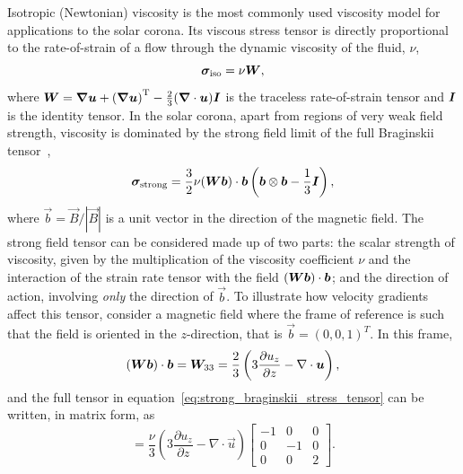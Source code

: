 Isotropic (Newtonian) viscosity is the most commonly used viscosity model for applications to the solar corona. Its viscous stress tensor is directly proportional to the rate-of-strain of a flow through the dynamic viscosity of the fluid, $\nu$,
\begin{equation}
{\bm \sigma}_{\text{iso}} = \nu {\bm W},
\label{eq:isotropic_stress_tensor}
\end{equation}
where ${\bm W} = {\bm \nabla {\bm u}} + {({\bm \nabla {\bm u}})}^{\text{T}} - \frac{2}{3}({\bm \nabla} \cdot {\bm u}) {\bm I}$ is the traceless rate-of-strain tensor and ${\bm I}$ is the identity tensor.
In the solar corona, apart from regions of very weak field strength, viscosity is dominated by the strong field limit of the full Braginskii tensor~\cite{hollwegViscosityChewGoldbergerLowEquations1986},
\begin{equation}
{\bm \sigma}_{\text{strong}} = \frac{3}{2} \nu ({\bm W}{\bm b}) \cdot {\bm b} \left( {\bm b} \otimes {\bm b} - \frac{1}{3}{\bm I}\right),
\label{eq:strong_braginskii_stress_tensor}
\end{equation}
where $\vec{b} = \vec{B}/|\vec{B}|$ is a unit vector in the direction of the magnetic field. The strong field tensor can be considered made up of two parts: the scalar strength of viscosity, given by the multiplication of the viscosity coefficient $\nu$ and the interaction of the strain rate tensor with the field $({\bm W} {\bm b}) \cdot {\bm b}$; and the direction of action, involving \emph{only} the direction of $\vec{b}$.
To illustrate how velocity gradients affect this tensor, consider a magnetic field  where the frame of reference is such that the field is oriented in the $z$-direction, that is $\vec{b} = {(0,0,1)}^T$. In this frame,
   \begin{equation}
   ({\bm W} {\bm b}) \cdot {\bm b} = {\bm W}_{33} = \frac{2}{3}\left(3\frac{\partial u_z}{\partial z} - \nabla \cdot {\bm u} \right),
   \end{equation}
   and the full tensor in equation~\eqref{eq:strong_braginskii_stress_tensor} can be written, in matrix form, as
   \begin{equation}
[\ten{\sigma}_{\text{strong}}] = \frac{\nu}{3}\left(3\frac{\partial u_z}{\partial z} - \nabla \cdot \vec{u} \right)
  \begin{bmatrix}
  -1 & 0 & 0 \\
    0 & -1 & 0 \\
    0 & 0 & 2
    \end{bmatrix}.
    \label{eq:parallel_tensor}
    \end{equation}
